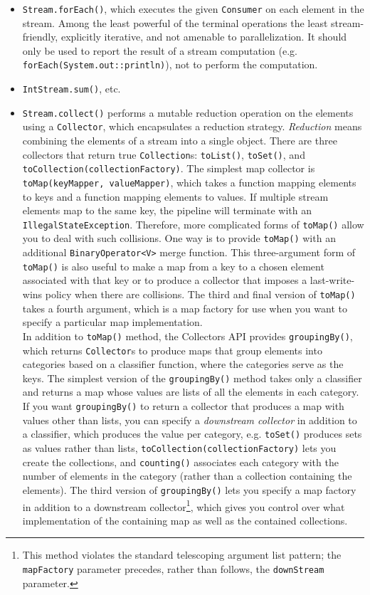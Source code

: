 \documentclass[8pt, table, xcdraw]{article}%
\begin{document}
\begin{itemize}
    \item \lstinline{Stream.forEach()}, which executes the given \lstinline{Consumer} on each element in the stream. Among the least powerful of the terminal operations the least stream-friendly, explicitly iterative, and not amenable to parallelization. It should only be used to report the result of a stream computation (e.g. \lstinline{forEach(System.out::println)}), not to perform the computation.
    \item \lstinline{IntStream.sum()}, etc.
    \item \lstinline{Stream.collect()} performs a mutable reduction operation on the elements using a \lstinline{Collector}, which encapsulates a reduction strategy. \emph{Reduction} means combining the elements of a stream into a single object. There are three collectors that return true \lstinline{Collection}s: \lstinline{toList()}, \lstinline{toSet()}, and \lstinline{toCollection(collectionFactory)}. The simplest map collector is \lstinline{toMap(keyMapper, valueMapper)}, which takes a function mapping elements to keys and a function mapping elements to values. If multiple stream elements map to the same key, the pipeline will terminate with an \lstinline{IllegalStateException}. Therefore, more complicated forms of \lstinline{toMap()} allow you to deal with such collisions. One way is to provide \lstinline{toMap()} with an additional \lstinline{BinaryOperator<V>} merge function. This three-argument form of \lstinline{toMap()} is also useful to make a map from a key to a chosen element associated with that key or to produce a collector that imposes a last-write-wins policy when there are collisions. The third and final version of \lstinline{toMap()} takes a fourth argument, which is a map factory for use when you want to specify a particular map implementation.\\
    In addition to \lstinline{toMap()} method, the Collectors API provides \lstinline{groupingBy()}, which returns \lstinline{Collector}s to produce maps that group elements into categories based on a classifier function, where the categories serve as the keys. The simplest version of the \lstinline{groupingBy()} method takes only a classifier and returns a map whose values are lists of all the elements in each category. If you want \lstinline{groupingBy()} to return a collector that produces a map with values other than lists, you can specify a \emph{downstream collector} in addition to a classifier, which produces the value per category, e.g. \lstinline{toSet()} produces sets as values rather than lists, \lstinline{toCollection(collectionFactory)} lets you create the collections, and \lstinline{counting()} associates each category with the number of elements in the category (rather than a collection containing the elements). The third version of \lstinline{groupingBy()} lets you specify a map factory in addition to a downstream collector\footnote{This method violates the standard telescoping argument list pattern; the \lstinline{mapFactory} parameter precedes, rather than follows, the \lstinline{downStream} parameter.}, which gives you control over what implementation of the containing map as well as the contained collections.\\

\end{itemize}
\end{document}

